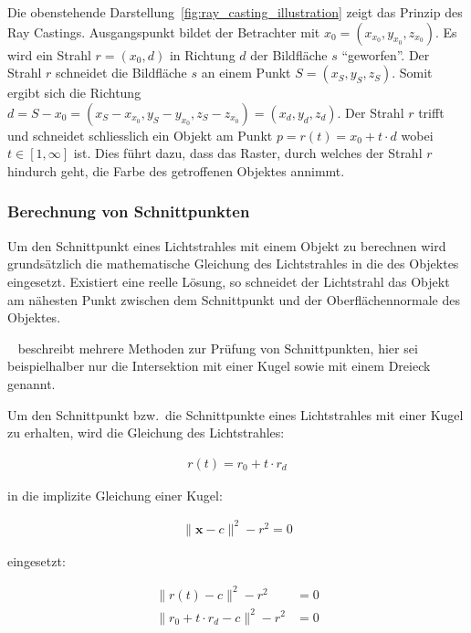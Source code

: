 Die obenstehende Darstellung~\ref{fig:ray_casting_illustration} zeigt
das Prinzip des Ray Castings. Ausgangspunkt bildet der Betrachter mit
$x_{0} = (x_{x_{0}}, y_{x_{0}}, z_{x_{0}})$. Es wird ein Strahl $r = (x_{0}, d)$
in Richtung $d$ der Bildfläche $s$ ``geworfen''. Der Strahl $r$
schneidet die Bildfläche $s$ an einem Punkt $S = (x_{S}, y_{S}, z_{S})$.
Somit ergibt sich die Richtung $d = S - x_{0} = (x_{S} - x_{x_{0}},
y_{S} - y_{x_{0}}, z_{S} - z_{x_{0}}) = (x_{d}, y_{d}, z_{d})$. Der
Strahl $r$ trifft und schneidet schliesslich ein Objekt am Punkt $p =
r(t) = x_{0} + t \cdot d$ wobei $t \in [1, \infty]$ ist. Dies führt dazu, dass das
Raster, durch welches der Strahl $r$ hindurch geht, die Farbe des
getroffenen Objektes annimmt.

\subsubsection{Berechnung von Schnittpunkten}
\label{ssubsec:ray_casting_intersections}

Um den Schnittpunkt eines Lichtstrahles mit einem Objekt zu berechnen
wird grundsätzlich die mathematische Gleichung des Lichtstrahles in die
des Objektes eingesetzt. Existiert eine reelle Lösung, so schneidet der
Lichtstrahl das Objekt am nähesten Punkt zwischen dem Schnittpunkt und
der Oberflächennormale des Objektes.

~\citeauthor{glassner_introduction_1989} beschreibt mehrere Methoden zur
Prüfung von Schnittpunkten, hier sei beispielhalber nur die Intersektion
mit einer Kugel sowie mit einem Dreieck genannt.

Um den Schnittpunkt bzw.\ die Schnittpunkte eines Lichtstrahles mit
einer Kugel zu erhalten, wird die Gleichung des Lichtstrahles:

\begin{gather}
    r(t) = r_{0} + t \cdot r_{d}
\end{gather}

in die implizite Gleichung einer Kugel:

\begin{gather}
    \|\bm{x} - c\|^{2} - r^{2} = 0
\end{gather}

eingesetzt:

\begin{align}
    \|r(t) - c\|^{2} - r^{2} &= 0 \\
    \|r_{0} + t \cdot r_{d} - c\|^{2} - r^{2} &= 0
\end{align}

